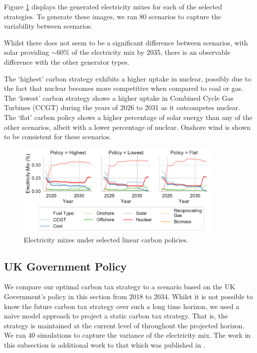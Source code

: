 Figure \ref{fig:best_electricity_mixes_facet} displays the generated electricity mixes for each of the selected strategies. To generate these images, we ran 80 scenarios to capture the variability between scenarios. 

Whilst there does not seem to be a significant difference between scenarios, with solar providing ${\sim}60\%$ of the electricity mix by 2035, there is an observable difference with the other generator types.

The `highest' carbon strategy exhibits a higher uptake in nuclear, possibly due to the fact that nuclear becomes more competitive when compared to coal or gas. The `lowest' carbon strategy shows a higher uptake in Combined Cycle Gas Turbines (CCGT) during the years of 2026 to 2031 as it outcompetes nuclear. The `flat' carbon policy shows a higher percentage of solar energy than any of the other scenarios, albeit with a lower percentage of nuclear. Onshore wind is shown to be consistent for these scenarios.

\begin{figure}
	\centering
	\includegraphics[width=0.9\textwidth]{Chapter6/figures/results/best_electricity_mixes_facet}
	\caption{Electricity mixes under selected linear carbon policies.}
	\label{fig:best_electricity_mixes_facet}
\end{figure}


\subsection{UK Government Policy}

We compare our optimal carbon tax strategy to a scenario based on the UK Government's policy in this section from 2018 to 2034. Whilst it is not possible to know the future carbon tax strategy over such a long time horizon, we used a naive model approach to project a static carbon tax strategy. That is, the strategy is maintained at the current level of  throughout the projected horizon. We ran 40 simulations to capture the variance of the electricity mix. The work in this subsection is additional work to that which was published in \cite{Kell2020a}.

